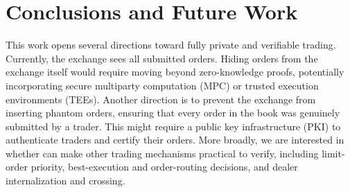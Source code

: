 
\section{Conclusions and Future Work}

This work opens several directions toward fully private and verifiable trading. 
Currently, the exchange sees all submitted orders. Hiding orders from the exchange itself would require moving beyond zero-knowledge proofs, potentially incorporating secure multiparty computation (MPC) or trusted execution environments (TEEs). 
Another direction is to prevent the exchange from inserting phantom orders, ensuring that every order in the book was genuinely submitted by a trader. This might require a public key infrastructure (PKI) to authenticate traders and certify their orders.
More broadly, we are interested in whether \ari can make other trading mechanisms practical to verify, including limit-order priority, best-execution and order-routing decisions, and dealer internalization and crossing.




